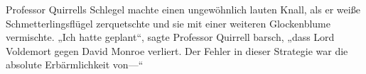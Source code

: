 Professor Quirrells Schlegel machte einen ungewöhnlich lauten Knall, als er weiße Schmetterlingsflügel zerquetschte und sie mit einer weiteren Glockenblume vermischte.
„Ich hatte geplant“, sagte Professor Quirrell barsch, „dass Lord Voldemort gegen David Monroe verliert. Der Fehler in dieser Strategie war die absolute Erbärmlichkeit von—“
